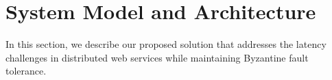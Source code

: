 \documentclass[conference]{IEEEtran}
\begin{document}
\section{System Model and Architecture}
\label{sec:system-model}

In this section, we describe our proposed solution that addresses the latency challenges in distributed web services while maintaining Byzantine fault tolerance.








\end{document}
